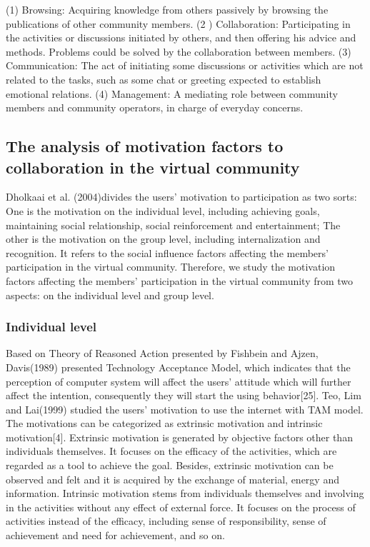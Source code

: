 \documentclass{elsarticle}
\begin{document}
(1) Browsing: Acquiring knowledge from others passively by browsing the publications of other community members. 
(2 ) Collaboration: Participating in the activities or discussions initiated by others, and then offering his advice and methods. Problems could be solved by the collaboration between members.
(3) Communication: The act of initiating some discussions or activities which are not related to the tasks, such as some chat or greeting expected to establish emotional relations. 
(4) Management: A mediating role between community members and
community operators, in charge of everyday concerns. 

\subsection{The analysis of motivation factors to collaboration in the virtual community }
\label{sec:analys-motiv-fact}

 Dholkaai et al. (2004)divides the users’ motivation to participation as two sorts: One is the motivation on the individual level, including achieving goals, maintaining social relationship, social reinforcement and entertainment; The other is the motivation on the group level, including internalization and recognition. It refers to the social influence factors affecting the members’ participation in the virtual community. Therefore, we study the motivation factors affecting the members’ participation in the virtual community from two aspects: on the individual level and group level.  

\subsubsection{Individual level}
\label{sec:individual-level}

Based on Theory of Reasoned Action presented by Fishbein and Ajzen, Davis(1989) presented Technology Acceptance Model, which indicates that the perception of computer system will affect the users’ attitude which will further affect the intention, consequently they will start the using behavior[25]. Teo, Lim and Lai(1999) studied the users’ motivation to use the internet with TAM model. The motivations can be categorized as extrinsic motivation and intrinsic motivation[4]. Extrinsic motivation is generated by objective factors other than individuals themselves. It focuses on the efficacy of the activities, which are regarded as a tool to achieve the goal. Besides, extrinsic motivation can be observed and felt and it is acquired by the exchange of material, energy and information. Intrinsic motivation stems from individuals themselves and involving in the activities without any effect of external force. It focuses on the process of activities instead of the efficacy, including sense of responsibility, sense of achievement and need for achievement, and so on. 
\end{document}
